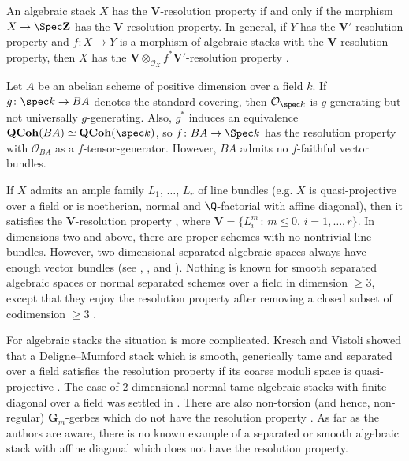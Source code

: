 \documentclass[reqno,a4paper]{amsart}
\numberwithin{Theorem}{section}
\newcommand{\Orb}{\mathcal{O}}
\newcommand{\Vect}{\mathbf{V}}
\newcommand{\QCoh}{\mathbf{QCoh}}
\theoremstyle{plain}
\theoremstyle{remark}
\newcommand{\spref}[1]{\href{https://stacks.math.columbia.edu/tag/#1}{#1}}
\begin{document}
\begin{remark} \label{rem:composition} An algebraic stack $X$ has the $\Vect$-resolution property if and
only if the morphism $X \to \Spec \mathbf{Z}$ has the $\Vect$-resolution
property. In general, if $Y$ has the $\mathbf{V}'$-resolution
property and $f \colon X \to Y$ is a morphism of algebraic
stacks with the $\Vect$-resolution property, then $X$ has the $\Vect\otimes_{\Orb_X} f^*\mathbf{V}'$-resolution property \cite[Prop.\ 2.8(v)]{2013arXiv1306.5418G}.
\end{remark}
\begin{Example}
    Let $A$ be an abelian scheme of positive dimension over a field $k$. If $g\colon \spec k \to BA$ denotes the standard covering, then $\Orb_{\spec k}$ is $g$-generating but not universally $g$-generating. Also, $g^*$ induces an equivalence $\QCoh(BA) \simeq \QCoh(\spec k)$, so $f\colon BA \to \Spec k$ has the resolution property with $\mathcal{O}_{BA}$ as a $f$-tensor-generator. However, $BA$ admits no $f$-faithful vector bundles.
\end{Example}
\begin{Example} \label{ex:knownres} If $X$ admits an ample family
  $L_1$, $\dots$, $L_r$ of line bundles \cite[Tag \spref{0FXR}]{stacks-project} (e.g. $X$ is quasi-projective over a
  field or is noetherian, normal and $\Q$-factorial with affine diagonal), then it satisfies the
  $\Vect$-resolution property \cite[Ex.\ 5.9(i)]{2013arXiv1306.5418G},
  where $\Vect = \{ L_i^{m} \,:\, m\leq 0,\, i=1,\dots, r\}$. In
  dimensions two and above, there are proper schemes with no
  nontrivial line bundles.  However, two-dimensional separated
  algebraic spaces always have enough vector bundles (see
  \cite[Thm.\ 2.1]{NormalSurfaceRes}, \cite[Thm.\ 5.2]{gross_2012}, and
  \cite[Thm.\ 41]{mathur2021resolution}). Nothing is known for smooth separated
  algebraic spaces or normal separated schemes over a field in dimension $\geq 3$, except that they enjoy the resolution property after removing a closed subset of codimension $\geq 3$ \cite{zbMATH07641743}.
\end{Example}
\begin{Example} \label{ex:stackres} For algebraic stacks the situation
  is more complicated. Kresch and Vistoli showed that a
  Deligne--Mumford stack which is smooth, generically tame and separated over a
  field satisfies the resolution property if its coarse moduli space
  is quasi-projective \cite[Thm.~1.3]{MR2026412}. The case of $2$-dimensional normal
  tame algebraic stacks with finite diagonal over a field was settled in
  \cite[Thm.~1]{mathur2021resolution}. There are also non-torsion (and
  hence, non-regular) $\mathbf{G}_m$-gerbes which do not have the
  resolution property \cite[Rem.~1.11b]{Brauer2}. As far as the authors are aware, there
  is no known example of a separated or smooth algebraic stack with affine
  diagonal which does not have the resolution property.
\end{Example}
\end{document}
